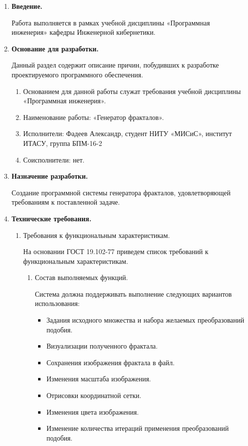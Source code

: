 \documentclass[a4paper,12pt,preview]{report} %
\renewcommand{\theenumi}{\arabic{enumi}}%
\renewcommand{\labelenumi}{\arabic{enumi}}%
\newenvironment{boenumerate}
{\begin{enumerate}\renewcommand\labelenumi{\textbf\theenumi}}
	{\end{enumerate}}
\begin{document}
	\begin{boenumerate}
		\item \textbf{Введение.} 
		
		Работа выполняется в рамках учебной дисциплины «Программная инженерия» кафедры Инженерной кибернетики.
		
		\item \textbf{Основание для разработки.}
		
		Данный раздел содержит описание причин, побудивших к разработке проектируемого программного обеспечения. 
		
		\begin{enumerate}
			\item Основанием для данной работы служат требования учебной дисциплины «Программная инженерия».
			\item Наименование работы: «Генератор фракталов».
			\item Исполнители: Фадеев Александр, студент НИТУ «МИСиС», институт ИТАСУ, группа БПМ-16-2
			\item Соисполнители: нет.
		\end{enumerate}
	
		\item \textbf{Назначение разработки.}
		
		Создание программной системы генератора фракталов, удовлетворяющей требованиям к поставленной задаче.
		
		\item \textbf{Технические требования.}
		
		\begin{enumerate}
			\item Требования к функциональным характеристикам.
			
			На основании ГОСТ 19.102-77 приведем список требований к функциональным характеристикам.
			
			\begin{enumerate}
				\item Состав выполняемых функций.
				
				Система должна поддерживать выполнение следующих вариантов использования:
				
				\begin{itemize}
					\item Задания исходного множества и набора желаемых преобразований подобия.
					\item Визуализации полученного фрактала.
					\item Сохранения изображения фрактала в файл.
					\item Изменения масштаба изображения.
					\item Отрисовки координатной сетки.
					\item Изменения цвета изображения.
					\item Изменение количества итераций применения преобразований подобия.
				\end{itemize}
			

\end{enumerate}
\end{enumerate}
\end{boenumerate}
\end{document}
